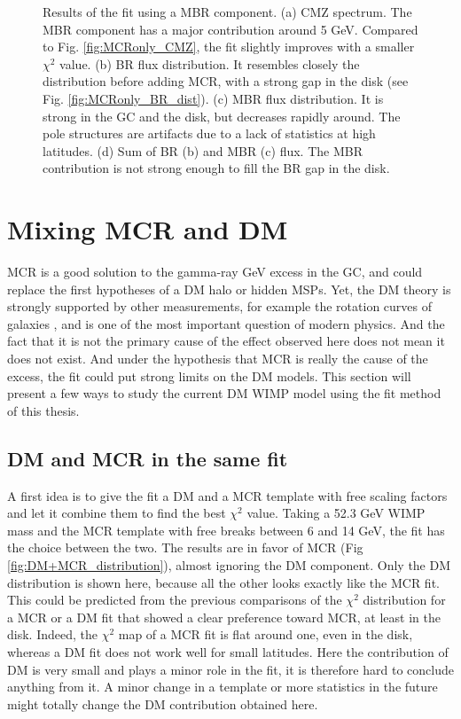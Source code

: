\begin{figure}[H]
\begin{minipage}[h]{0.45\textwidth}
	  \subcaption{}
	  \label{}
  \end{minipage}
  \caption[Results of the fit with MBR.]{Results of the fit using a MBR component. (a) CMZ spectrum. The MBR component has a major contribution around 5 GeV. Compared to Fig. \ref{fig:MCRonly_CMZ}, the fit slightly improves with a smaller $\chi^2$ value. (b) BR flux distribution. It resembles closely the distribution before adding MCR, with a strong gap in the disk (see Fig. \ref{fig:MCRonly_BR_dist}). (c) MBR flux distribution. It is strong in the GC and the disk, but decreases rapidly around. The pole structures are artifacts due to a lack of statistics at high latitudes. (d) Sum of BR (b) and MBR (c) flux. The MBR contribution is not strong enough to fill the BR gap in the disk.}
  \label{fig:MBR_results}	 
\end{figure}




\newpage
\section{Mixing MCR and DM}

MCR is a good solution to the gamma-ray GeV excess in the GC, and could replace the first hypotheses of a DM halo or hidden MSPs. Yet, the DM theory is strongly supported by other measurements, for example the rotation curves of galaxies  \cite{Newby2018} \cite{Rubin1971}, and is one of the most important question of modern physics. And the fact that it is not the primary cause of the effect observed here does not mean it does not exist. And under the hypothesis that MCR is really the cause of the excess, the fit could put strong limits on the DM models.
This section will present a few ways to study the current DM WIMP model using the fit method of this thesis.


\subsection{DM and MCR in the same fit}

A first idea is to give the fit a DM and a MCR template with free scaling factors and let it combine them to find the best $\chi^2$ value. Taking a 52.3 GeV WIMP mass and the MCR template with free breaks between 6 and 14 GeV, the fit has the choice between the two. 
The results are in favor of MCR (Fig \ref{fig:DM+MCR_distribution}), almost ignoring the DM component. Only the DM distribution is shown here, because all the other looks exactly like the MCR fit. This could be predicted from the previous comparisons of the $\chi^2$ distribution for a MCR or a DM fit that showed a clear preference toward MCR, at least in the disk. Indeed, the $\chi^2$ map of a MCR fit is flat around one, even in the disk, whereas a DM fit does not work well for small latitudes. Here the contribution of DM is very small and plays a minor role in the fit, it is therefore hard to conclude anything from it. A minor change in a template or more statistics in the future might totally change the DM contribution obtained here.

